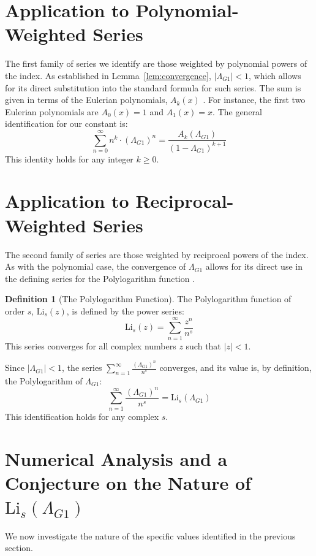 \documentclass{amsart}
\theoremstyle{plain}
\theoremstyle{definition}
\newtheorem{definition}[theorem]{Definition}
\theoremstyle{remark}
\newcommand{\LambdaG}{\Lambda_{G1}}
\begin{document}
\section{Application to Polynomial-Weighted Series}
The first family of series we identify are those weighted by polynomial powers of the index. As established in Lemma~\ref{lem:convergence}, $|\LambdaG|<1$, which allows for its direct substitution into the standard formula for such series. The sum is given in terms of the Eulerian polynomials, $A_k(x)$ \cite{AandS}. For instance, the first two Eulerian polynomials are $A_0(x)=1$ and $A_1(x)=x$. The general identification for our constant is:
$$ \sum_{n=0}^{\infty} n^k \cdot (\LambdaG)^n = \frac{A_k(\LambdaG)}{(1-\LambdaG)^{k+1}} $$
This identity holds for any integer $k \ge 0$.

\section{Application to Reciprocal-Weighted Series}
The second family of series are those weighted by reciprocal powers of the index. As with the polynomial case, the convergence of $\LambdaG$ allows for its direct use in the defining series for the Polylogarithm function \cite{Lewin}.

\begin{definition}[The Polylogarithm Function]
The Polylogarithm function of order $s$, $\mathrm{Li}_s(z)$, is defined by the power series:
$$ \mathrm{Li}_s(z) = \sum_{n=1}^{\infty} \frac{z^n}{n^s} $$
This series converges for all complex numbers $z$ such that $|z|<1$.
\end{definition}

Since $|\LambdaG| < 1$, the series $\sum_{n=1}^{\infty} \frac{(\LambdaG)^{n}}{n^s}$ converges, and its value is, by definition, the Polylogarithm of $\LambdaG$:
$$ \sum_{n=1}^{\infty} \frac{(\LambdaG)^{n}}{n^s} = \mathrm{Li}_s(\LambdaG) $$
This identification holds for any complex $s$.

\section{Numerical Analysis and a Conjecture on the Nature of \texorpdfstring{$\mathrm{Li}_s(\LambdaG)$}{Li\_s(Lambda\_G1)}}
We now investigate the nature of the specific values identified in the previous section.
\end{document}
